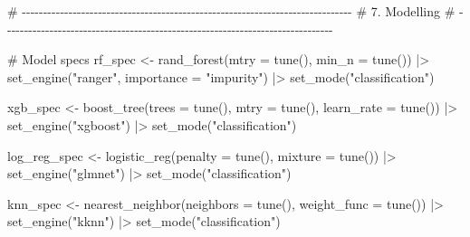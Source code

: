\documentclass[
  11pt,
  letterpaper,
  DIV=11,
  numbers=noendperiod]{scrartcl}
\newenvironment{Shaded}{\begin{snugshade}}{\end{snugshade}}
\newcommand{\AttributeTok}[1]{\textcolor[rgb]{0.40,0.45,0.13}{#1}}
\newcommand{\CommentTok}[1]{\textcolor[rgb]{0.37,0.37,0.37}{#1}}
\newcommand{\FunctionTok}[1]{\textcolor[rgb]{0.28,0.35,0.67}{#1}}
\newcommand{\NormalTok}[1]{\textcolor[rgb]{0.00,0.23,0.31}{#1}}
\newcommand{\OtherTok}[1]{\textcolor[rgb]{0.00,0.23,0.31}{#1}}
\newcommand{\SpecialCharTok}[1]{\textcolor[rgb]{0.37,0.37,0.37}{#1}}
\newcommand{\StringTok}[1]{\textcolor[rgb]{0.13,0.47,0.30}{#1}}
\begin{document}
\begin{Shaded}
\begin{Highlighting}[]
\CommentTok{\# {-}{-}{-}{-}{-}{-}{-}{-}{-}{-}{-}{-}{-}{-}{-}{-}{-}{-}{-}{-}{-}{-}{-}{-}{-}{-}{-}{-}{-}{-}{-}{-}{-}{-}{-}{-}{-}{-}{-}{-}{-}{-}{-}{-}{-}{-}{-}{-}{-}{-}{-}{-}{-}{-}{-}{-}{-}{-}{-}{-}{-}{-}{-}{-}{-}{-}{-}{-}{-}{-}{-}{-}{-}{-}{-}{-}{-}{-}}
\CommentTok{\# 7. Modelling}
\CommentTok{\# {-}{-}{-}{-}{-}{-}{-}{-}{-}{-}{-}{-}{-}{-}{-}{-}{-}{-}{-}{-}{-}{-}{-}{-}{-}{-}{-}{-}{-}{-}{-}{-}{-}{-}{-}{-}{-}{-}{-}{-}{-}{-}{-}{-}{-}{-}{-}{-}{-}{-}{-}{-}{-}{-}{-}{-}{-}{-}{-}{-}{-}{-}{-}{-}{-}{-}{-}{-}{-}{-}{-}{-}{-}{-}{-}{-}{-}{-}}

\CommentTok{\# Model specs}
\NormalTok{rf\_spec }\OtherTok{\textless{}{-}} \FunctionTok{rand\_forest}\NormalTok{(}\AttributeTok{mtry =} \FunctionTok{tune}\NormalTok{(), }\AttributeTok{min\_n =} \FunctionTok{tune}\NormalTok{()) }\SpecialCharTok{|\textgreater{}}
  \FunctionTok{set\_engine}\NormalTok{(}\StringTok{"ranger"}\NormalTok{, }\AttributeTok{importance =} \StringTok{"impurity"}\NormalTok{) }\SpecialCharTok{|\textgreater{}}
  \FunctionTok{set\_mode}\NormalTok{(}\StringTok{"classification"}\NormalTok{)}

\NormalTok{xgb\_spec }\OtherTok{\textless{}{-}} \FunctionTok{boost\_tree}\NormalTok{(}\AttributeTok{trees =} \FunctionTok{tune}\NormalTok{(), }\AttributeTok{mtry =} \FunctionTok{tune}\NormalTok{(), }\AttributeTok{learn\_rate =} \FunctionTok{tune}\NormalTok{()) }\SpecialCharTok{|\textgreater{}}
  \FunctionTok{set\_engine}\NormalTok{(}\StringTok{"xgboost"}\NormalTok{) }\SpecialCharTok{|\textgreater{}}
  \FunctionTok{set\_mode}\NormalTok{(}\StringTok{"classification"}\NormalTok{)}

\NormalTok{log\_reg\_spec }\OtherTok{\textless{}{-}} \FunctionTok{logistic\_reg}\NormalTok{(}\AttributeTok{penalty =} \FunctionTok{tune}\NormalTok{(), }\AttributeTok{mixture =} \FunctionTok{tune}\NormalTok{()) }\SpecialCharTok{|\textgreater{}}
  \FunctionTok{set\_engine}\NormalTok{(}\StringTok{"glmnet"}\NormalTok{) }\SpecialCharTok{|\textgreater{}}
  \FunctionTok{set\_mode}\NormalTok{(}\StringTok{"classification"}\NormalTok{)}

\NormalTok{knn\_spec }\OtherTok{\textless{}{-}} \FunctionTok{nearest\_neighbor}\NormalTok{(}\AttributeTok{neighbors =} \FunctionTok{tune}\NormalTok{(), }\AttributeTok{weight\_func =} \FunctionTok{tune}\NormalTok{()) }\SpecialCharTok{|\textgreater{}}
  \FunctionTok{set\_engine}\NormalTok{(}\StringTok{"kknn"}\NormalTok{) }\SpecialCharTok{|\textgreater{}}
  \FunctionTok{set\_mode}\NormalTok{(}\StringTok{"classification"}\NormalTok{)}


\end{Highlighting}
\end{Shaded}
\end{document}
